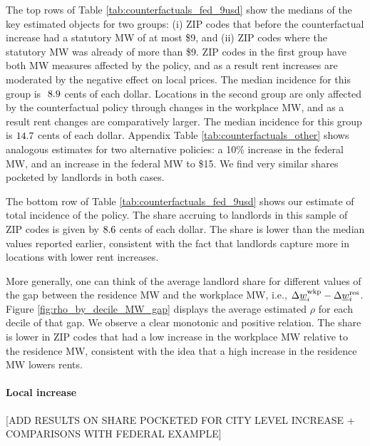 The top rows of Table \ref{tab:counterfactuals_fed_9usd} show the medians of 
the key estimated objects for two groups: 
(i) ZIP codes that before the counterfactual increase had a statutory MW of 
at most \$9, and 
(ii) ZIP codes where the statutory MW was already of more than \$9.
ZIP codes in the first group have both MW measures affected by the policy,
and as a result rent increases are moderated by the negative effect on local
prices.
The median incidence for this group is $\textnormal{ 8.9}$ cents of each 
dollar.
Locations in the second group are only affected by the counterfactual policy 
through changes in the workplace MW, and as a result rent changes are 
comparatively larger.
The median incidence for this group is $\textnormal{14.7}$ cents of each 
dollar.
Appendix Table \ref{tab:counterfactuals_other} shows analogous estimates for
two alternative policies: a 10\% increase in the federal MW, and an increase
in the federal MW to \$15.
We find very similar shares pocketed by landlords in both cases.

The bottom row of Table \ref{tab:counterfactuals_fed_9usd} shows our estimate
of total incidence of the policy.
The share accruing to landlords in this sample of ZIP codes is given by 
$\textnormal{8.6}$ cents of each dollar.
The share is lower than the median values reported earlier, consistent with
the fact that landlords capture more in locations with lower rent increases.

More generally, one can think of the average landlord share for different 
values of the gap between the residence MW and the workplace MW, 
i.e., $\Delta \underline{w}_i^{\text{wkp}} - \Delta \underline{w}_i^{\text{res}}$.
Figure \ref{fig:rho_by_decile_MW_gap} displays the average estimated $\rho$ for 
each decile of that gap.
We observe a clear monotonic and positive relation.
The share is lower in ZIP codes that had a low increase in the workplace MW 
relative to the residence MW, consistent with the idea that a high increase 
in the residence MW lowers rents.

\paragraph{Local increase}

[ADD RESULTS ON SHARE POCKETED FOR CITY LEVEL INCREASE + COMPARISONS
WITH FEDERAL EXAMPLE]
